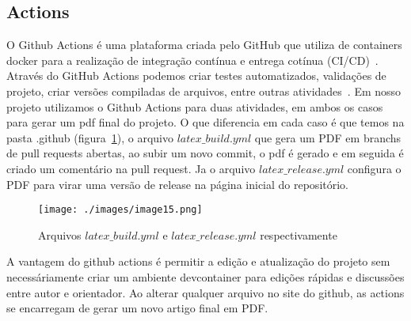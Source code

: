 \subsection{Actions}

O Github Actions é uma plataforma criada pelo GitHub que utiliza de containers docker para a realização de integração contínua e entrega cotínua (CI/CD)~\cite{github:02}. Através do GitHub Actions podemos criar testes automatizados, validações de projeto, criar versões compiladas de arquivos, entre outras atividades~\cite{github:02}. Em nosso projeto utilizamos o Github Actions para duas atividades, em ambos os casos para gerar um pdf final do projeto. O que diferencia em cada caso é que temos na pasta .github (figura~\ref{fig:image15}), o arquivo $latex\_build.yml$ que gera um PDF em branchs de pull requests abertas, ao subir um novo commit, o pdf é gerado e em seguida é criado um comentário na pull request. Ja o arquivo $latex\_release.yml$ configura o PDF para virar uma versão de release na página inicial do repositório.

\begin{figure}[ht]
	\centering
	\texttt{[image: ./images/image15.png]}
	\caption{Arquivos $latex\_build.yml$ e $latex\_release.yml$ respectivamente}
	\label{fig:image15}
\end{figure}

A vantagem do github actions é permitir a edição e atualização do projeto sem necessáriamente criar um ambiente devcontainer para edições rápidas e discussões entre autor e orientador. Ao alterar qualquer arquivo no site do github, as actions se encarregam de gerar um novo artigo final em PDF.